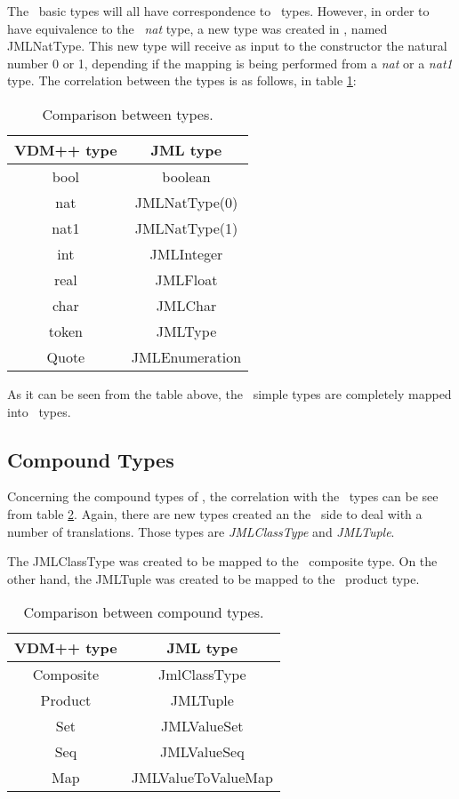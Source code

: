 The \vpp\ basic types will all have correspondence to \jml\ types. However, in order to have equivalence to the \vpp\ \textit{nat} type, a new type was created in \jml, named JMLNatType. This new type will receive as input to the constructor the natural number 0 or 1, depending if the mapping is being performed from a \textit{nat} or a \textit{nat1} type. The correlation between the types is as follows, in table \ref{chap3:tab:types}:

\begin{table}[h!t!p!]\centering
\begin{tabular}{| c | c |}
\hline
VDM++ type & JML type \\
\hline
\hline
bool & boolean \\
\hline
nat & JMLNatType(0) \\
\hline
nat1 & JMLNatType(1) \\
\hline
int & JMLInteger \\
\hline
real & JMLFloat \\
\hline
char & JMLChar \\
\hline
token & JMLType \\
\hline
Quote & JMLEnumeration \\
\hline
\end{tabular}
\caption{Comparison between types.}
\label{chap3:tab:types}
\end{table}

As it can be seen from the table above, the \vpp\ simple types are completely mapped into \jml\ types. 

\subsection{Compound Types}

Concerning the compound types of \vpp, the correlation with the \jml\ types can be see from table \ref{chap3:tab:typescomp}. Again, there are new types created an the \jml\ side to deal with a number of translations. Those types are \textit{JMLClassType} and \textit{JMLTuple}.

The JMLClassType was created to be mapped to the \vpp\ composite type. On the other hand, the JMLTuple was created to be mapped to the \vpp\ product type.

\begin{table}[h!t!p!]\centering
\begin{tabular}{| c | c |}
\hline
VDM++ type & JML type \\
\hline
\hline
Composite & JmlClassType\\
\hline
Product & JMLTuple\\
\hline
Set & JMLValueSet\\
\hline
Seq & JMLValueSeq\\
\hline
Map & JMLValueToValueMap\\
\hline
\end{tabular}
\caption{Comparison between compound types.}
\label{chap3:tab:typescomp}
\end{table}

